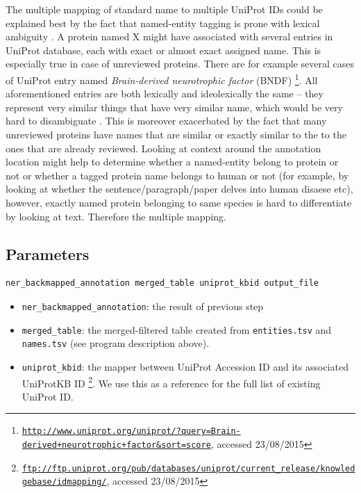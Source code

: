 The multiple mapping of standard name to multiple UniProt IDs could be explained best by the fact that named-entity tagging is prone with lexical ambiguity \citep{ratinov2009design}. A protein named X might have associated with several entries in UniProt database, each with exact or almost exact assigned name. This is especially true in case of unreviewed proteins. There are for example several cases of UniProt entry named \textit{Brain-derived neurotrophic factor} (BNDF) \footnote{\href{http://www.uniprot.org/uniprot/?query=Brain-derived+neurotrophic+factor&sort=score}{\texttt{http://www.uniprot.org/uniprot/?query=Brain-derived+neurotrophic+factor\&sort=score}}, accessed 23/08/2015}. All aforementioned entries are both lexically and ideolexically the same -- they represent very similar things that have very similar name, which would be very hard to disambiguate \citep{ratinov2009design}. This is moreover exacerbated by the fact that many unreviewed proteins have names that are similar or exactly similar to the to the ones that are already reviewed. Looking at context around the annotation location might help to determine whether a named-entity belong to protein or not or whether a tagged protein name belongs to human or not (for example, by looking at whether the sentence/paragraph/paper delves into human disaese etc), however, exactly named protein belonging to same species is hard to differentiate by looking at text. Therefore the multiple mapping.

\subsection{Parameters}

\begin{lstlisting}[breaklines]
ner_backmapped_annotation merged_table uniprot_kbid output_file
\end{lstlisting}

\begin{itemize}
\item \texttt{ner\_backmapped\_annotation}: the result of previous step
\item \texttt{merged\_table}: the merged-filtered table created from \texttt{entities.tsv} and \texttt{names.tsv} (see program description above).
\item \texttt{uniprot\_kbid}: the mapper between UniProt Accession ID and its associated UniProtKB ID \footnote{ \href{ftp://ftp.uniprot.org/pub/databases/uniprot/current_release/knowledgebase/idmapping/}{\texttt{ftp://ftp.uniprot.org/pub/databases/uniprot/current\_release/knowledgebase/idmapping/}}, accessed 23/08/2015}. We use this as a reference for the full list of existing UniProt ID.
\end{itemize}

